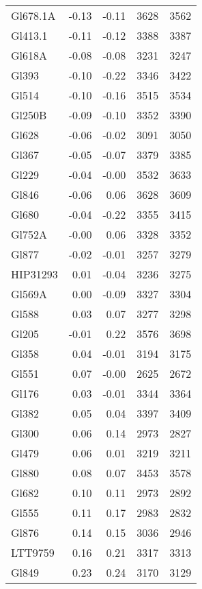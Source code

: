 \documentclass[structabstract]{aa}
\begin{document}
\begin{table}[]
\begin{center}
\begin{tabular}{l r r r r }
Gl678.1A & -0.13 & -0.11 & 3628 & 3562 \\
Gl413.1 & -0.11 & -0.12 & 3388 & 3387 \\
Gl618A & -0.08 & -0.08 & 3231 & 3247 \\
Gl393 & -0.10 & -0.22 & 3346 & 3422 \\
Gl514 & -0.10 & -0.16 & 3515 & 3534 \\
Gl250B & -0.09 & -0.10 & 3352 & 3390 \\
Gl628 & -0.06 & -0.02 & 3091 & 3050 \\
Gl367 & -0.05 & -0.07 & 3379 & 3385 \\
Gl229 & -0.04 & -0.00 & 3532 & 3633 \\
Gl846 & -0.06 & 0.06 & 3628 & 3609 \\
Gl680 & -0.04 & -0.22 & 3355 & 3415 \\
Gl752A & -0.00 & 0.06 & 3328 & 3352 \\
Gl877 & -0.02 & -0.01 & 3257 & 3279 \\
HIP31293 & 0.01 & -0.04 & 3236 & 3275 \\
Gl569A & 0.00 & -0.09 & 3327 & 3304 \\
Gl588 & 0.03 & 0.07 & 3277 & 3298 \\
Gl205 & -0.01 & 0.22 & 3576 & 3698 \\
Gl358 & 0.04 & -0.01 & 3194 & 3175 \\
Gl551 & 0.07 & -0.00 & 2625 & 2672 \\
Gl176 & 0.03 & -0.01 & 3344 & 3364 \\
Gl382 & 0.05 & 0.04 & 3397 & 3409 \\
Gl300 & 0.06 & 0.14 & 2973 & 2827 \\
Gl479 & 0.06 & 0.01 & 3219 & 3211 \\
Gl880 & 0.08 & 0.07 & 3453 & 3578 \\
Gl682 & 0.10 & 0.11 & 2973 & 2892 \\
Gl555 & 0.11 & 0.17 & 2983 & 2832 \\
Gl876 & 0.14 & 0.15 & 3036 & 2946 \\
LTT9759 & 0.16 & 0.21 & 3317 & 3313 \\
Gl849 & 0.23 & 0.24 & 3170 & 3129 \\

\hline
\hline
\end{tabular}
\end{center}
\end{table}
\end{document}
